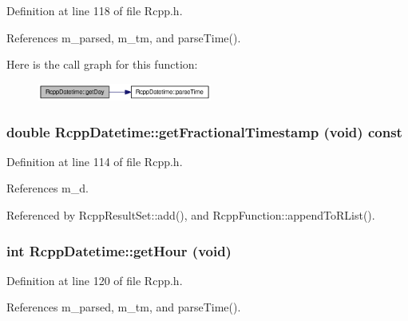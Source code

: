 Definition at line 118 of file Rcpp.h.

References m\_\-parsed, m\_\-tm, and parseTime().

Here is the call graph for this function:\nopagebreak
\begin{figure}[H]
\begin{center}
\leavevmode
\includegraphics[width=162pt]{classRcppDatetime_23e9f09bef162e1ffef0e43f8a446b77_cgraph}
\end{center}
\end{figure}
\hypertarget{classRcppDatetime_cb74d27387c0d851414e20d30354ac62}{
\subsubsection[{getFractionalTimestamp}]{\setlength{\rightskip}{0pt plus 5cm}double RcppDatetime::getFractionalTimestamp (void) const}}
\label{classRcppDatetime_cb74d27387c0d851414e20d30354ac62}




Definition at line 114 of file Rcpp.h.

References m\_\-d.

Referenced by RcppResultSet::add(), and RcppFunction::appendToRList().\hypertarget{classRcppDatetime_0da8db1ecd235a6e7ab309e70e4e93b0}{
\subsubsection[{getHour}]{\setlength{\rightskip}{0pt plus 5cm}int RcppDatetime::getHour (void)}}
\label{classRcppDatetime_0da8db1ecd235a6e7ab309e70e4e93b0}




Definition at line 120 of file Rcpp.h.

References m\_\-parsed, m\_\-tm, and parseTime().

